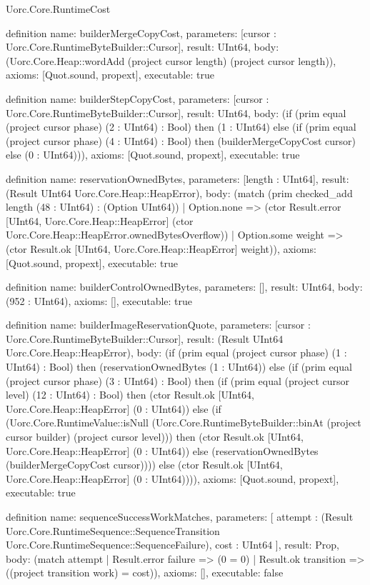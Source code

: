 \begin{lexlean}{Uorc.Core.RuntimeCost}
\begin{semanticmodule}
definition{
  name: builderMergeCopyCost,
  parameters: [cursor : Uorc.Core.RuntimeByteBuilder::Cursor],
  result: UInt64,
  body: (Uorc.Core.Heap::wordAdd (project cursor length) (project cursor length)),
  axioms: [Quot.sound, propext],
  executable: true
}

definition{
  name: builderStepCopyCost,
  parameters: [cursor : Uorc.Core.RuntimeByteBuilder::Cursor],
  result: UInt64,
  body: (if (prim equal (project cursor phase) (2 : UInt64) : Bool) then (1 : UInt64) else (if (prim equal (project cursor phase) (4 : UInt64) : Bool) then (builderMergeCopyCost cursor) else (0 : UInt64))),
  axioms: [Quot.sound, propext],
  executable: true
}

definition{
  name: reservationOwnedBytes,
  parameters: [length : UInt64],
  result: (Result UInt64 Uorc.Core.Heap::HeapError),
  body: (match (prim checked_add length (48 : UInt64) : (Option UInt64))
    | Option.none => (ctor Result.error [UInt64, Uorc.Core.Heap::HeapError] (ctor Uorc.Core.Heap::HeapError.ownedBytesOverflow))
    | Option.some weight => (ctor Result.ok [UInt64, Uorc.Core.Heap::HeapError] weight)),
  axioms: [Quot.sound, propext],
  executable: true
}

definition{
  name: builderControlOwnedBytes,
  parameters: [],
  result: UInt64,
  body: (952 : UInt64),
  axioms: [],
  executable: true
}

definition{
  name: builderImageReservationQuote,
  parameters: [cursor : Uorc.Core.RuntimeByteBuilder::Cursor],
  result: (Result UInt64 Uorc.Core.Heap::HeapError),
  body: (if (prim equal (project cursor phase) (1 : UInt64) : Bool) then (reservationOwnedBytes (1 : UInt64)) else (if (prim equal (project cursor phase) (3 : UInt64) : Bool) then (if (prim equal (project cursor level) (12 : UInt64) : Bool) then (ctor Result.ok [UInt64, Uorc.Core.Heap::HeapError] (0 : UInt64)) else (if (Uorc.Core.RuntimeValue::isNull (Uorc.Core.RuntimeByteBuilder::binAt (project cursor builder) (project cursor level))) then (ctor Result.ok [UInt64, Uorc.Core.Heap::HeapError] (0 : UInt64)) else (reservationOwnedBytes (builderMergeCopyCost cursor)))) else (ctor Result.ok [UInt64, Uorc.Core.Heap::HeapError] (0 : UInt64)))),
  axioms: [Quot.sound, propext],
  executable: true
}

definition{
  name: sequenceSuccessWorkMatches,
  parameters: [
    attempt : (Result Uorc.Core.RuntimeSequence::SequenceTransition Uorc.Core.RuntimeSequence::SequenceFailure),
    cost : UInt64
  ],
  result: Prop,
  body: (match attempt
    | Result.error failure => (0 = 0)
    | Result.ok transition => ((project transition work) = cost)),
  axioms: [],
  executable: false
}


\end{semanticmodule}
\end{lexlean}
